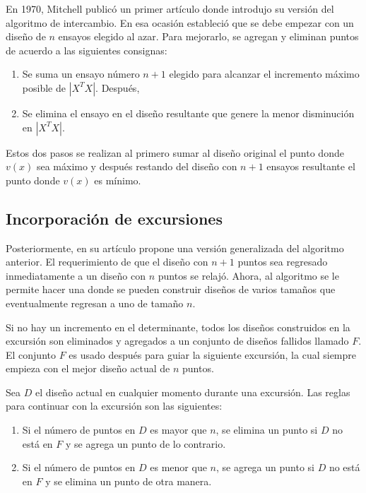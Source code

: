 En 1970, Mitchell publicó un primer artículo donde introdujo su versión del algoritmo de intercambio. En esa ocasión estableció que se debe empezar con un diseño de $n$ ensayos elegido al azar. Para mejorarlo, se agregan y eliminan puntos de acuerdo a las siguientes consignas: 

\begin{enumerate}
	\item Se suma un ensayo número $n+1$ elegido para alcanzar el incremento máximo posible de $|X^{T}X|$. Después, 
	\item Se elimina el ensayo en el diseño resultante que genere la menor disminución en  $|X^{T}X|$. 
\end{enumerate}

Estos dos pasos se realizan al primero sumar al diseño original el punto donde $v(x)$ sea máximo y después restando del diseño con $n+1$ ensayos resultante el punto donde $v(x)$ es mínimo.

\subsection{Incorporación de excursiones}

Posteriormente, en su artículo \cite{mitchelldetmax} propone una versión generalizada del algoritmo anterior. El requerimiento de que el diseño con $n+1$ puntos sea regresado inmediatamente a un diseño con $n$ puntos se relajó. Ahora, al algoritmo se le permite hacer una  donde se pueden construir diseños de varios tamaños que eventualmente regresan a uno de tamaño $n$.  

Si no hay un incremento en el determinante, todos los diseños construidos en la excursión son eliminados y agregados a un conjunto de diseños fallidos llamado $F$. El conjunto $F$ es usado después para guiar la siguiente excursión, la cual siempre empieza con el mejor diseño actual de $n$ puntos. 

Sea $D$ el diseño actual en cualquier momento durante una excursión. Las reglas para continuar con la excursión son las siguientes:

\begin{enumerate}
	\item Si el número de puntos en $D$ es mayor que $n$, se elimina un punto si $D$ no está en $F$ y se agrega un punto de lo contrario. 
	
	\item Si el número de puntos en $D$ es menor que $n$, se agrega un punto si $D$ no está en $F$ y se elimina un punto de otra manera. 
\end{enumerate}

